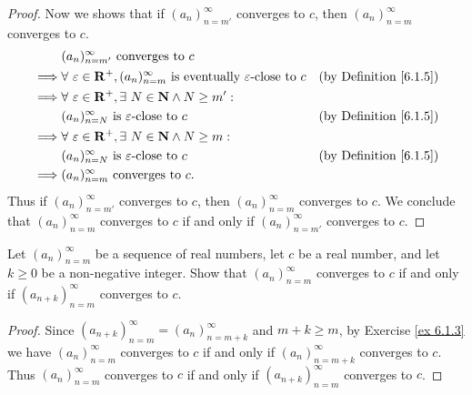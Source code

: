 \begin{proof}
    Now we shows that if \((a_n)_{n = m'}^\infty\) converges to \(c\), then \((a_n)_{n = m}^\infty\) converges to \(c\).
    \begin{align*}
                 & (a_n)_{n = m'}^\infty \text{ converges to } c                                                                                                          \\
        \implies & \forall\ \varepsilon \in \mathbf{R}^+, (a_n)_{n = m}^\infty \text{ is eventually } \varepsilon\text{-close to } c & \text{(by Definition \ref{6.1.5})} \\
        \implies & \forall\ \varepsilon \in \mathbf{R}^+, \exists\ N \in \mathbf{N} \land N \geq m' :                                                                     \\
                 & (a_n)_{n = N}^\infty \text{ is } \varepsilon\text{-close to } c                                                   & \text{(by Definition \ref{6.1.5})} \\
        \implies & \forall\ \varepsilon \in \mathbf{R}^+, \exists\ N \in \mathbf{N} \land N \geq m :                                                                      \\
                 & (a_n)_{n = N}^\infty \text{ is } \varepsilon\text{-close to } c                                                   & \text{(by Definition \ref{6.1.5})} \\
        \implies & (a_n)_{n = m}^\infty \text{ converges to } c.
    \end{align*}
    Thus if \((a_n)_{n = m'}^\infty\) converges to \(c\), then \((a_n)_{n = m}^\infty\) converges to \(c\).
    We conclude that \((a_n)_{n = m}^\infty\) converges to \(c\) if and only if \((a_n)_{n = m'}^\infty\) converges to \(c\).
\end{proof}

\begin{exercise}\label{ex 6.1.4}
    Let \((a_n)_{n = m}^\infty\) be a sequence of real numbers, let \(c\) be a real number, and let \(k \geq 0\) be a non-negative integer.
    Show that \((a_n)_{n = m}^\infty\) converges to \(c\) if and only if \((a_{n + k})_{n = m}^\infty\) converges to \(c\).
\end{exercise}

\begin{proof}
    Since \((a_{n + k})_{n = m}^\infty = (a_n)_{n = m + k}^\infty\) and \(m + k \geq m\), by Exercise \ref{ex 6.1.3} we have \((a_n)_{n = m}^\infty\) converges to \(c\) if and only if \((a_n)_{n = m + k}^\infty\) converges to \(c\).
    Thus \((a_n)_{n = m}^\infty\) converges to \(c\) if and only if \((a_{n + k})_{n = m}^\infty\) converges to \(c\).
\end{proof}

